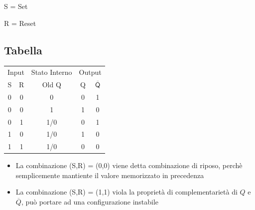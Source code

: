\hfil
\begin{minipage}{0.15\textwidth}
    \begin{center}
        {
            \Large
            S = Set

            R = Reset
        }
    \end{center}
\end{minipage}

\subsection{Tabella}
\begin{minipage}[t]{0.35\textwidth}
    \begin{center}
        \begin{tabular}{|c|c|c|c|c|}
            \hline
            \multicolumn{2}{|c|}{Input} & Stato Interno & \multicolumn{2}{c|}{Output} \\
            \multicolumn{1}{|c}{S} & \multicolumn{1}{c|}{R} & Old Q & \multicolumn{1}{c}{Q} & \multicolumn{1}{c|}{$\overline{\mathsf{Q}}$} \\
            \hline
            0 & 0 & 0 & 0 & 1 \\
            \hline
            0 & 0 & 1 & 1 & 0 \\
            \hline
            0 & 1 & 1/0 & 0 & 1 \\
            \hline
            1 & 0 & 1/0 & 1 & 0 \\
            \hline
            1 & 1 & 1/0 & 0 & 0 \\
            \hline
        \end{tabular}
    \end{center}
\end{minipage}
\hfil
\begin{minipage}{0.6\textwidth}
    \begin{itemize}
        \item La combinazione (S,R) = (0,0) viene detta combinazione di riposo, perchè semplicemente mantiente il valore memorizzato in precedenza
        
        \vspace{0.3cm}

        \item La combinazione (S,R) = (1,1) viola la proprietà di complementarietà di $Q$ e $\overline{Q}$, può portare ad una configurazione instabile
    \end{itemize}
\end{minipage}

